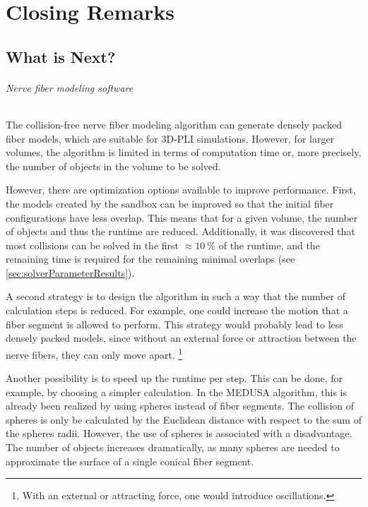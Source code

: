 \newpage\null\thispagestyle{empty}\newpage
\clearpage{\thispagestyle{empty}\cleardoublepage}
\part{Closing Remarks}
%
%
%
\setcounter{chapter}{9}
\chapter{What is Next?}
\label{sec:outlook}
%
\paragraph{Nerve fiber modeling software}
%
The collision-free nerve fiber modeling algorithm can generate densely packed fiber models, which are suitable for \ac{3D-PLI} simulations.
However, for larger volumes, the algorithm is limited in terms of computation time or, more precisely, the number of objects in the volume to be solved.
\par
%
However, there are optimization options available to improve performance.
First, the models created by the sandbox can be improved so that the initial fiber configurations have less overlap.
This means that for a given volume, the number of objects and thus the runtime are reduced.
Additionally, it was discovered that most collisions can be solved in the first $\approx \SI{10}{\percent}$ of the runtime, and the remaining time is required for the remaining minimal overlaps (see \cref{sec:solverParameterResults}).
\par
%
A second strategy is to design the algorithm in such a way that the number of calculation steps is reduced.
For example, one could increase the motion that a fiber segment is allowed to perform.
This strategy would probably lead to less densely packed models, since without an external force or attraction between the nerve fibers, they can only move apart. \footnote{With an external or attracting force, one would introduce oscillations.}
\par
%
Another possibility is to speed up the runtime per step.
This can be done, for example, by choosing a simpler calculation.
In the \ac{MEDUSA} algorithm, this is already been realized by using spheres instead of fiber segments.
The collision of spheres is only be calculated by the Euclidean distance with respect to the sum of the spheres radii.
However, the use of spheres is associated with a disadvantage.
The number of objects increases dramatically, as many spheres are needed to approximate the surface of a single conical fiber segment.
